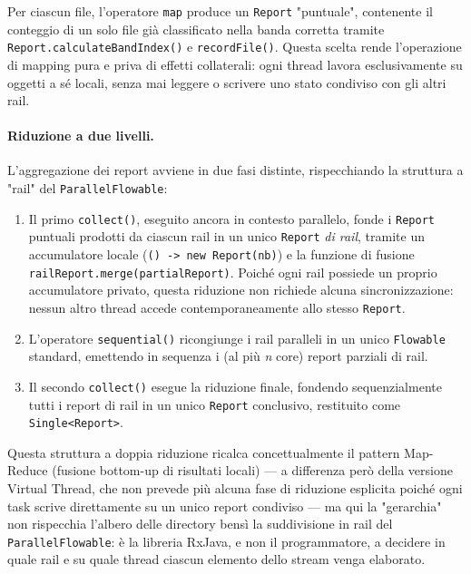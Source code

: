 \documentclass[11pt,a4paper]{article}
\begin{document}
Per ciascun file, l'operatore \texttt{map} produce un \texttt{Report} "puntuale", contenente il conteggio di un solo file già classificato nella banda corretta tramite \texttt{Report.calculateBandIndex()} e \texttt{recordFile()}. Questa scelta rende l'operazione di mapping pura e priva di effetti collaterali: ogni thread lavora esclusivamente su oggetti a sé locali, senza mai leggere o scrivere uno stato condiviso con gli altri rail.

\paragraph{Riduzione a due livelli.}

L'aggregazione dei report avviene in due fasi distinte, rispecchiando la struttura a "rail" del \texttt{ParallelFlowable}:

\begin{enumerate}
    \item Il primo \texttt{collect()}, eseguito ancora in contesto parallelo, fonde i \texttt{Report} puntuali prodotti da ciascun rail in un unico \texttt{Report} \textit{di rail}, tramite un accumulatore locale (\texttt{() -> new Report(nb)}) e la funzione di fusione \texttt{railReport.merge(partialReport)}. Poiché ogni rail possiede un proprio accumulatore privato, questa riduzione non richiede alcuna sincronizzazione: nessun altro thread accede contemporaneamente allo stesso \texttt{Report}.
    \item L'operatore \texttt{sequential()} ricongiunge i rail paralleli in un unico \texttt{Flowable} standard, emettendo in sequenza i (al più \textit{n} core) report parziali di rail.
    \item Il secondo \texttt{collect()} esegue la riduzione finale, fondendo sequenzialmente tutti i report di rail in un unico \texttt{Report} conclusivo, restituito come \texttt{Single<Report>}.
\end{enumerate}

Questa struttura a doppia riduzione ricalca concettualmente il pattern Map-Reduce (fusione bottom-up di risultati locali) — a differenza però della versione Virtual Thread, che non prevede più alcuna fase di riduzione esplicita poiché ogni task scrive direttamente su un unico report condiviso — ma qui la "gerarchia" non rispecchia l'albero delle directory bensì la suddivisione in rail del \texttt{ParallelFlowable}: è la libreria RxJava, e non il programmatore, a decidere in quale rail e su quale thread ciascun elemento dello stream venga elaborato.
\end{document}
